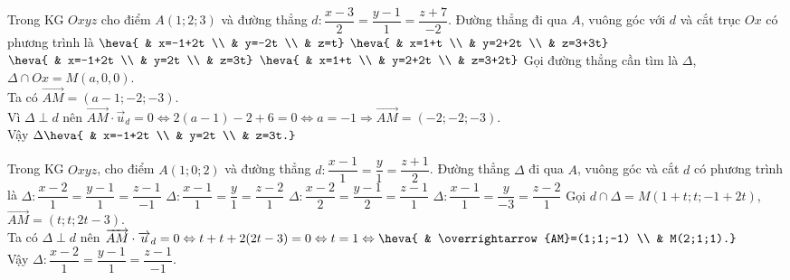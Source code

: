 \begin{ex}%
	Trong KG $Oxyz$ cho điểm $A(1;2;3)$ và đường thẳng $d\colon \dfrac{x-3}{2}=\dfrac{y-1}{1}=\dfrac{z+7}{-2}$. Đường thẳng đi qua $A$, vuông góc với $d$ và cắt trục $Ox$ có phương trình là
	\choice
	{$\heva{ & x=-1+2t \\ & y=-2t \\ & z=t}$}
	{$\heva{ & x=1+t \\ & y=2+2t \\ & z=3+3t}$}
	{\True $\heva{ & x=-1+2t \\ & y=2t \\ & z=3t}$}
	{$\heva{ & x=1+t \\ & y=2+2t \\ & z=3+2t}$}
	\loigiai
	{
		Gọi đường thẳng cần tìm là $\Delta$, $\Delta \cap Ox=M(a,0,0)$.\\
		Ta có $\overrightarrow{AM}=(a-1;-2;-3)$.\\
		Vì $\Delta\perp d$ nên $\overrightarrow{AM}\cdot\overrightarrow{u}_{d}=0\Leftrightarrow 2(a-1)-2+6=0\Leftrightarrow a=-1\Rightarrow \overrightarrow{AM}=(-2;-2;-3)$.\\
		Vậy $\Delta \heva{ & x=-1+2t \\ & y=2t \\ & z=3t.}$
	}
\end{ex}

\begin{ex}%
	Trong KG $Oxyz$, cho điểm  $A(1;0;2)$ và đường thẳng $d\colon \dfrac{x-1}{1}=\dfrac{y}{1}=\dfrac{z+1}{2}$. Đường thẳng $\Delta$ đi qua $A$, vuông góc và cắt $d$ có phương trình là
	\choice
	{\True $\Delta\colon \dfrac{x-2}{1}=\dfrac{y-1}{1}=\dfrac{z-1}{-1}$}
	{$\Delta\colon \dfrac{x-1}{1}=\dfrac{y}{1}=\dfrac{z-2}{1}$}
	{$\Delta\colon \dfrac{x-2}{2}=\dfrac{y-1}{2}=\dfrac{z-1}{1}$}
	{$\Delta\colon \dfrac{x-1}{1}=\dfrac{y}{-3}=\dfrac{z-2}{1}$}
	\loigiai
	{
		Gọi $d\cap\Delta=M(1+t;t;-1+2t)$, $\overrightarrow{AM}=(t;t;2t-3)$.\\
		Ta có $\Delta\perp d$ nên $\overrightarrow{AM}\cdot\overrightarrow{u}_{d}=0 \Leftrightarrow t+t+2(2t-3)=0 \Leftrightarrow t=1 \Leftrightarrow \heva{ & \overrightarrow{AM}=(1;1;-1) \\ & M(2;1;1).}$\\
		Vậy $\Delta\colon \dfrac{x-2}{1}=\dfrac{y-1}{1}=\dfrac{z-1}{-1}$.
	}
\end{ex}

